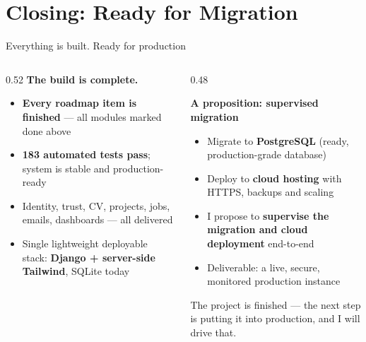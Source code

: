 \documentclass[aspectratio=169, 10pt]{beamer}
\newcommand{\keypoint}[1]{%
  \begin{tcolorbox}[enhanced, colback=utlight, colframe=utteal,
    boxrule=0pt, leftrule=3pt, arc=2pt, boxsep=4pt, left=6pt, right=6pt, top=4pt, bottom=4pt]
    \color{utnavy}#1
  \end{tcolorbox}%
}
\begin{document}
\section{Closing: Ready for Migration}

\begin{frame}{Everything is built. Ready for production}
  \begin{columns}[T]
    \begin{column}{0.52\textwidth}
      {\color{utnavy}\bfseries The build is complete.}\\[6pt]
      \begin{itemize}\small
        \item \textbf{Every roadmap item is finished} --- all modules marked done above
        \item \textbf{183 automated tests pass}; system is stable and production-ready
        \item Identity, trust, CV, projects, jobs, emails, dashboards --- all delivered
        \item Single lightweight deployable stack: \textbf{Django + server-side Tailwind}, SQLite today
      \end{itemize}
    \end{column}
    \begin{column}{0.48\textwidth}
      \begin{tcolorbox}[enhanced, colback=utcream, colframe=utamber, boxrule=0pt, leftrule=3pt, arc=2pt, boxsep=8pt]
        {\color{utnavy}\textbf{A proposition: supervised migration}}\\[2pt]
        \begin{itemize}\small
          \item Migrate to \textbf{PostgreSQL} (ready, production-grade database)
          \item Deploy to \textbf{cloud hosting} with HTTPS, backups and scaling
          \item I propose to \textbf{supervise the migration and cloud deployment} end-to-end
          \item Deliverable: a live, secure, monitored production instance
        \end{itemize}
      \end{tcolorbox}
      \vspace{4pt}
      \keypoint{\small The project is finished --- the next step is putting it into production, and I will drive that.}
    \end{column}
  \end{columns}
\end{frame}
\end{document}
